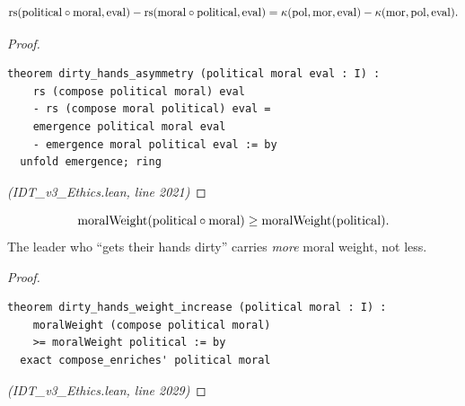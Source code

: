 \begin{theorem}
\label{thm:dirty-hands}
\[
  \mathrm{rs}(\mathrm{political} \circ \mathrm{moral}, \mathrm{eval})
  - \mathrm{rs}(\mathrm{moral} \circ \mathrm{political}, \mathrm{eval})
  = \kappa(\mathrm{pol}, \mathrm{mor}, \mathrm{eval})
  - \kappa(\mathrm{mor}, \mathrm{pol}, \mathrm{eval}).
\]
\end{theorem}

\begin{proof}
\begin{lstlisting}
theorem dirty_hands_asymmetry (political moral eval : I) :
    rs (compose political moral) eval
    - rs (compose moral political) eval =
    emergence political moral eval
    - emergence moral political eval := by
  unfold emergence; ring
\end{lstlisting}
\textit{(IDT\_v3\_Ethics.lean, line 2021)}
\end{proof}

\begin{theorem}
\label{thm:dirty-hands-weight}
\[
  \mathrm{moralWeight}(\mathrm{political} \circ \mathrm{moral})
  \geq \mathrm{moralWeight}(\mathrm{political}).
\]
The leader who ``gets their hands dirty'' carries \emph{more} moral weight,
not less.
\end{theorem}

\begin{proof}
\begin{lstlisting}
theorem dirty_hands_weight_increase (political moral : I) :
    moralWeight (compose political moral)
    >= moralWeight political := by
  exact compose_enriches' political moral
\end{lstlisting}
\textit{(IDT\_v3\_Ethics.lean, line 2029)}
\end{proof}

